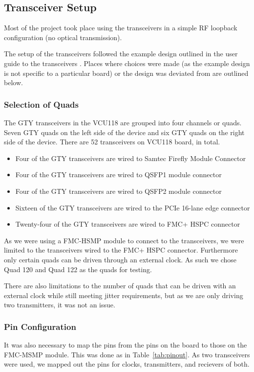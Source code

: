 \begin{figure}[ht]
\end{figure}

\subsection{Transceiver Setup}%
\label{sub:transceiver_setup}
Most of the project took place using the transceivers in a simple RF loopback
configuration (no optical transmission).

The setup of the transceivers followed the example design outlined in the user
guide to the transceivers \cite{wizard_guide}. Places where choices were made
(as the example design is not specific to a particular board) or the
design was deviated from are outlined below. 

\subsubsection{Selection of Quads}%
\label{ssub:selection_of_quads}
The GTY transceivers in the VCU118 are grouped into four channels or quads.
Seven GTY quads on the left side of the device and six GTY quads on the right
side of the device.
There are 52 transceivers on VCU118 board, in total.
\begin{itemize}
    \item Four of the GTY transceivers are wired to Samtec Firefly Module Connector 
    \item Four of the GTY transceivers are wired to QSFP1 module connector 
    \item Four of the GTY transceivers are wired to QSFP2 module connector 
    \item Sixteen of the GTY transceivers are wired to the PCIe 16-lane edge connector
    \item Twenty-four of the GTY transceivers are wired to FMC+ HSPC connector
\end{itemize}

As we were using a FMC-HSMP module to connect to the transceivers, we were limited to the transceivers wired
to the FMC+ HSPC connector.
Furthermore only certain quads can be driven through an external clock.
As such we chose Quad 120 and Quad 122 as the quads for testing.

There are also limitations to the number of quads that can be driven with an
external clock while still meeting jitter requirements, but as we are only
driving two transmitters, it was not an issue.



\subsubsection{Pin Configuration}%
\label{ssub:pin_configuration}
It was also necessary to map the pins from the pins on the board to those on
the FMC-MSMP module. This was done as in Table~\ref{tab:pinout}.
As two transceivers were used, we mapped out the pins for clocks, transmitters,
and recievers of both.

